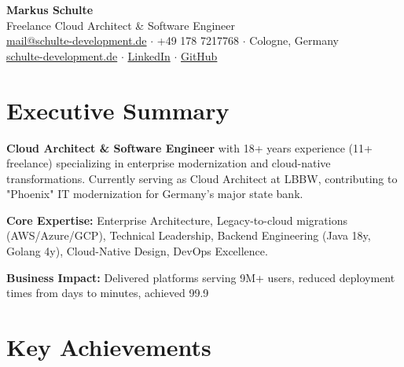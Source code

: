\documentclass[11pt,a4paper]{article}
\begin{document}
\begin{center}
{\LARGE \textbf{Markus Schulte}}\\[2pt]
{\large Freelance Cloud Architect \& Software Engineer}\\[4pt]
\href{mailto:mail@schulte-development.de}{mail@schulte-development.de} $\cdot$ +49 178 7217768 $\cdot$ Cologne, Germany\\
\href{https://schulte-development.de}{schulte-development.de} $\cdot$ \href{https://www.linkedin.com/in/markus-schulte/}{LinkedIn} $\cdot$ \href{https://github.com/SchulteDev}{GitHub}
\end{center}

\vspace{-6pt}

\section{Executive Summary}

\textbf{Cloud Architect \& Software Engineer} with 18+ years experience (11+ freelance) specializing in enterprise modernization and cloud-native transformations. Currently serving as Cloud Architect at LBBW, contributing to "Phoenix" IT modernization for Germany's major state bank.

\textbf{Core Expertise:} Enterprise Architecture, Legacy-to-cloud migrations (AWS/Azure/GCP), Technical Leadership, Backend Engineering (Java 18y, Golang 4y), Cloud-Native Design, DevOps Excellence.

\textbf{Business Impact:} Delivered platforms serving 9M+ users, reduced deployment times from days to minutes, achieved 99.9%

\vspace{-4pt}

\section{Key Achievements}
\end{document}
